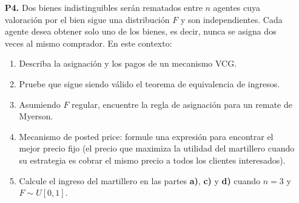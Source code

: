 \documentclass[11pt, spanish]{article}
\theoremstyle{plain}
\begin{document}
\begin{itemize}
\begin{enumerate}
\item Encuentre el mecanismo con Pivote de Clark que alcanza la
eficiencia (en este caso, eficiencia corresponde a la minimizaci\'on
de costo total).
\item Ahora consideramos una empresa interesada en minimizar el costo
total esperado a pagar. Para esto, suponga que el costo $c_i$ est\'a
distribuido de acuerdo a $F_i$ en el intervalo
$C=[\underline{c},\bar{c}]$. Un mecanismo estar\'a dado por funciones
de asignaci\'on $x_{iA}:C^n\rightarrow \mathbb{R}$,
$x_{iB}:C^n\rightarrow \mathbb{R}$ y $t:C^n\rightarrow \mathbb{R}^n$.
    \begin{enumerate}

    \item Escriba la funci\'on $U_i(c_i,c_i')$ que representa la
utilidad del agente $i$ si su verdadero costo es $c_i$ pero declara un
costo $c_i'$.

    \item Escriba el problema de maximizaci\'on que debe resolver el principal

    \item Demuestre que si un mecanismo es compatible en incentivos
entonces 
\[ R_i(c_i) := E_{c_{-i}}[x_{iA}(c_i,c_{-i})+x_{iB}(c_i,c_{-i})]
\]
es no-creciente en $c_i$ y
$V_i(c_i)=V_i(\bar{c})-\int\limits_{c_i}^{\bar{c}}R_i(s)ds$.

    \item Reescriba la funci\'on objetivo del principal de forma que
sea s\'olo funci\'on de $x_{iA}$ y $x_{iB}$.

    \item Encuentre el mecanismo \'optimo (puede asumir propiedades
necesarias sobre $F_i$).

    \end{enumerate}
\end{enumerate}
  
  \item[\textbf{P4.}] Dos bienes indistinguibles serán rematados entre $n$ agentes cuya valoración por el bien sigue una distribución $F$ y son independientes. Cada agente desea obtener solo uno de los bienes, es decir, nunca se asigna dos veces al mismo comprador. En este contexto:
 \begin{enumerate} 
     \item Describa la asignación y los pagos de un mecanismo VCG.
     \item Pruebe que sigue siendo válido el teorema de equivalencia de ingresos.
     \item Asumiendo $F$ regular, encuentre la regla de asignación para un remate de Myerson.
     \item Mecanismo de posted price: formule una expresión para encontrar el mejor precio fijo (el precio que maximiza la utilidad del martillero cuando su estrategia es cobrar el mismo precio a todos los clientes interesados).
     \item Calcule el ingreso del martillero en las partes \textbf{a)}, \textbf{c)} y \textbf{d)} cuando $n=3$ y $F\sim U[0,1]$.
\end{enumerate}
 

\end{itemize}
\end{document}
